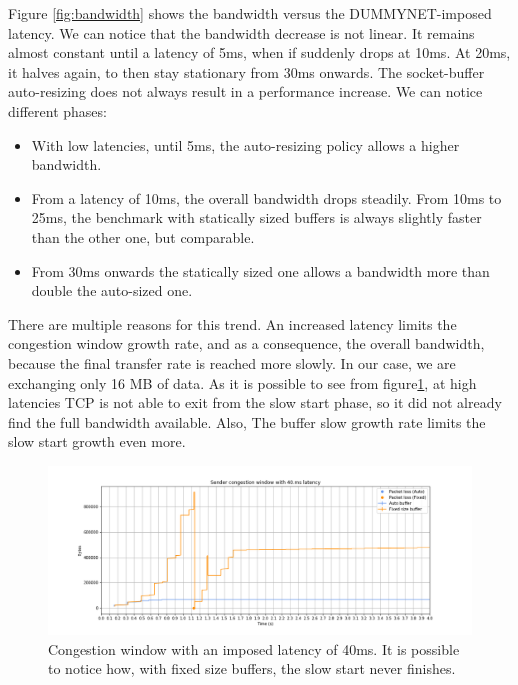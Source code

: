 \documentclass[a4paper,10pt]{article}
\begin{document}
Figure \ref{fig:bandwidth} shows the bandwidth versus the DUMMYNET-imposed latency. We can notice that the bandwidth decrease is not linear. It remains almost constant until a latency of 5ms, when if suddenly drops at 10ms. At 20ms, it halves again, to then stay stationary from 30ms onwards.
The socket-buffer auto-resizing does not always result in a performance increase. We can notice different phases:
\begin{itemize}
   \item With low latencies, until 5ms, the auto-resizing policy allows a higher bandwidth. %

   \item From a latency of 10ms, the overall bandwidth drops steadily. From 10ms to 25ms, the benchmark with statically sized buffers is always slightly faster than the other one, but comparable.
   \item From 30ms onwards the statically sized one allows a bandwidth more than double the auto-sized one. %
\end{itemize}

There are multiple reasons for this trend. 
An increased latency limits the congestion window growth rate, and as a consequence, the overall bandwidth, because the final transfer rate is reached more slowly. In our case, we are exchanging only 16 MB of data. As it is possible to see from figure\ref{fig:40_cwnd}, at high latencies TCP is not able to exit from the slow start phase, so it did not already find the full bandwidth available.
Also, The buffer slow growth rate limits the slow start growth even more.


\begin{figure}[h]
\centering
\includegraphics[width=\textwidth]{images/40_cwnd_comparison.png}
\caption{Congestion window with an imposed latency of 40ms. It is possible to notice how, with fixed size buffers, the slow start never finishes.}
\label{fig:40_cwnd}
\end{figure}
\end{document}
